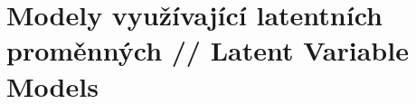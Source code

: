 \section{Modely využívající latentních proměnných // Latent Variable Models}
\label{sec:latent_variable_models}